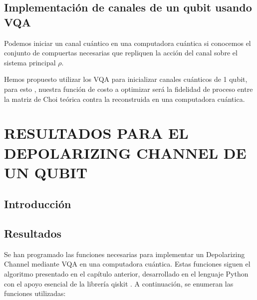 \documentclass[letterpaper,12pt]{thesisECFM}
\theoremstyle{plain}
\theoremstyle{definition}
\theoremstyle{remark}
\newcommand{\1}{\mathbb{1}}
\begin{document}
\section{Implementación de canales de un qubit usando VQA}
Podemos iniciar un canal cuántico en una computadora cuántica si conocemos el conjunto de compuertas necesarias que repliquen la acción del canal sobre el sistema principal $\rho$. \par 

Hemos propuesto utilizar los VQA para inicializar canales cuánticos de 1 qubit, para esto , nuestra función de costo a optimizar será la fidelidad de proceso entre la matriz de Choi teórica contra la reconstruida en una computadora cuántica. \par 
 

\chapter{RESULTADOS PARA EL DEPOLARIZING CHANNEL DE UN QUBIT } %
\section{Introducción} %
\section{Resultados} %
Se han programado las funciones necesarias para implementar un Depolarizing
Channel  mediante VQA en una computadora cuántica. Estas funciones siguen el
algoritmo presentado en el capítulo anterior, desarrollado en el lenguaje
Python con el apoyo esencial de la librería qiskit . A continuación, se enumeran
las funciones utilizadas: 
\end{document}
